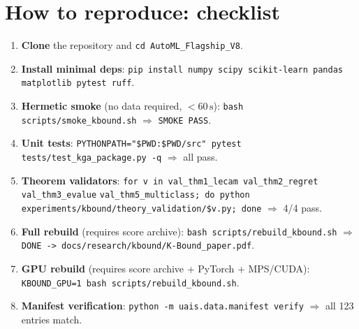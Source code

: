 \section{How to reproduce: checklist}
\label{sec:app-repro-checklist}

\begin{enumerate}
  \item \textbf{Clone} the repository and \texttt{cd AutoML\_Flagship\_V8}.
  \item \textbf{Install minimal deps}:
    \texttt{pip install numpy scipy scikit-learn pandas matplotlib pytest ruff}.
  \item \textbf{Hermetic smoke} (no data required, $< 60\,\mathrm{s}$):
    \texttt{bash scripts/smoke\_kbound.sh} $\Rightarrow$ \texttt{SMOKE PASS}.
  \item \textbf{Unit tests}: \texttt{PYTHONPATH="\$PWD:\$PWD/src" pytest
    tests/test\_kga\_package.py -q} $\Rightarrow$ all pass.
  \item \textbf{Theorem validators}:
    \texttt{for v in val\_thm1\_lecam val\_thm2\_regret val\_thm3\_evalue}
    \texttt{val\_thm5\_multiclass; do python}
    \texttt{experiments/kbound/theory\_validation/\$v.py; done}
    $\Rightarrow$ 4/4 pass.
  \item \textbf{Full rebuild} (requires score archive):
    \texttt{bash scripts/rebuild\_kbound.sh}
    $\Rightarrow$ \texttt{DONE -> docs/research/kbound/K-Bound\_paper.pdf}.
  \item \textbf{GPU rebuild} (requires score archive + PyTorch + MPS/CUDA):
    \texttt{KBOUND\_GPU=1 bash scripts/rebuild\_kbound.sh}.
  \item \textbf{Manifest verification}:
    \texttt{python -m uais.data.manifest verify}
    $\Rightarrow$ all 123 entries match.
\end{enumerate}